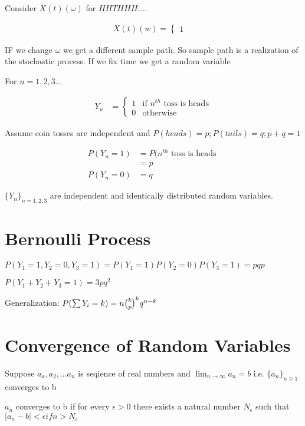 \documentclass{article}
\renewcommand{\choose}[2]{{{#1}\atopwithdelims(){#2}}}
\begin{document}
Consider $X(t)(\omega)$ for $HHTHHH...$.

\begin{align*}
X(t)(w) = \begin{cases}
1 & 
\end{cases}
\end{align*}

IF we change $\omega$ we get a different sample path. So sample path is a realization of the stochastic process. If we fix time we get a random variable

For $n=1,2,3\dots$

\begin{align*}
Y_n &= \begin{cases}
1 & \text{if $n^{th}$ toss is heads}\\
0 & \text{otherwise}
\end{cases}
\end{align*}

Assume coin tosses are independent and $P(heads)=p; P(tails)=q; p+q=1$

\begin{align*}
P(Y_n=1) &= P(\text{$n^{th}$ toss is heads } \\
&= p\\
P(Y_n=0) &= q
\end{align*}

$\{Y_n\}_{n=1,2,3}$ are independent and identically distributed random variables.

\section{Bernoulli Process}

$P(Y_1=1,Y_2=0, Y_3=1) = P(Y_1=1)P(Y_2=0)P(Y_3=1) = pqp$

$P(Y_1+Y_2+Y_3=1) = 3pq^2$

Generalization: $P(\sum Y_i = k) = n \choose {k} p^kq^{n-k}$


\section{Convergence of Random Variables}

Suppose $a_a, a_2, \dots a_n$ is seqience of real numbers and $\lim_{n \longrightarrow \infty} a_n = b$ i.e. $\{a_n\}_{n\geq 1}$ converges to b

$a_n$ converges to b if for every $\epsilon > 0$ there exists a natural number $N_\epsilon$ such that $|a_n-b| < \epsilon if n > N_\epsilon$
\end{document}
